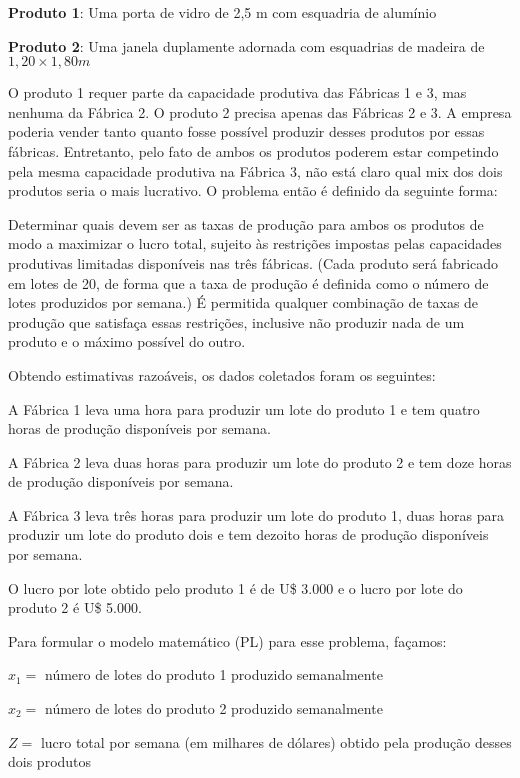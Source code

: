 \begin{alineas} 
\item[] \textbf{Produto 1}: Uma porta de vidro de 2,5 m com esquadria de alumínio
\item[] \textbf{Produto 2}: Uma janela duplamente adornada com esquadrias de madeira de $1,20 \times 1,80 m$ 
\end{alineas} 

O produto 1 requer parte da capacidade produtiva das Fábricas 1 e 3, mas nenhuma da Fábrica 2. O produto 2 precisa apenas das Fábricas 2 e 3. A empresa poderia vender tanto quanto fosse possível produzir desses produtos por essas fábricas. Entretanto, pelo fato de ambos os produtos poderem estar competindo pela mesma capacidade produtiva na Fábrica 3, não está claro qual mix dos dois produtos seria o mais lucrativo. O problema então é definido da seguinte forma: 

Determinar quais devem ser as taxas de produção para ambos os produtos de modo a maximizar o lucro total, sujeito às restrições impostas pelas capacidades produtivas limitadas disponíveis nas três fábricas. (Cada produto será fabricado em lotes de 20, de forma que a taxa de produção é definida como o número de lotes produzidos por semana.) É permitida qualquer combinação de taxas de produção que satisfaça essas restrições, inclusive não produzir nada de um produto e o máximo possível do outro. 

Obtendo estimativas razoáveis, os dados coletados foram os seguintes:

\begin{alineascomponto}
\item A Fábrica 1 leva uma hora para produzir um lote do produto 1 e tem quatro horas de produção disponíveis por semana.
\item A Fábrica 2 leva duas horas para produzir um lote do produto 2 e tem doze horas de produção disponíveis por semana.
\item A Fábrica 3 leva três horas para produzir um lote do produto 1, duas horas para produzir um lote do produto dois e tem dezoito horas de produção disponíveis por semana.
\item O lucro por lote obtido pelo produto 1 é de U\$ 3.000 e o lucro por lote do produto 2 é U\$ 5.000.
\end{alineascomponto}

Para formular o modelo matemático (PL) para esse problema, façamos:
\begin{alineas}
\item[] $x_1 =$ número de lotes do produto 1 produzido semanalmente
\item[] $x_2 =$ número de lotes do produto 2 produzido semanalmente
\item[] $Z =$ lucro total por semana (em milhares de dólares) obtido pela produção desses dois produtos
\end{alineas}

